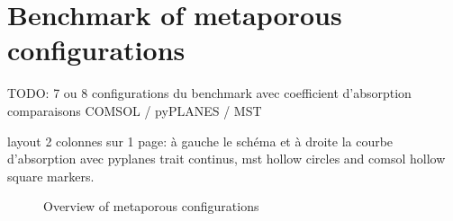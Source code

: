 \section{Benchmark of metaporous configurations}
\setcounter{equation}{0}
TODO: 7 ou 8 configurations du benchmark avec coefficient d'absorption comparaisons COMSOL / pyPLANES / MST 

layout 2 colonnes sur 1 page: à gauche le schéma et à droite la courbe d'absorption avec pyplanes trait continus, mst hollow circles and comsol hollow square markers.

\begin{figure}
    \caption{Overview of metaporous configurations}
\end{figure}